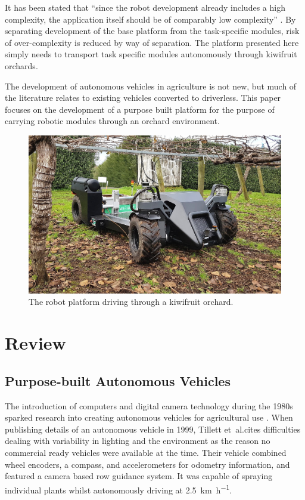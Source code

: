 \documentclass[preprint,authoryear,12pt]{elsarticle}
\begin{document}
    It has been stated that ``since the robot development already includes a high complexity, the application itself should be of comparably low complexity'' \citep{Ruckelshausen2009}.
    By separating development of the base platform from the task-specific modules, risk of over-complexity is reduced by way of separation.
    The platform presented here simply needs to transport task specific modules autonomously through kiwifruit orchards.

    The development of autonomous vehicles in agriculture is not new, but much of the literature relates to existing vehicles converted to driverless.
    This paper focuses on the development of a purpose built platform for the purpose of carrying robotic modules through an orchard environment.

    \begin{figure}[htb]
        \centering
        \includegraphics[width=\linewidth]{imgs/photos/suzy_general.jpg}
        \caption{
            The robot platform driving through a kiwifruit orchard.
        }
        \label{fig:suzy}
    \end{figure}

\section{Review}
\label{sect:review}

    \subsection{Purpose-built Autonomous Vehicles}

        The introduction of computers and digital camera technology during the 1980s sparked research into creating autonomous vehicles for agricultural use \cite{Li2009}.
        When publishing details of an autonomous vehicle in 1999, Tillett et~al.\@ cites difficulties dealing with variability in lighting and the environment as the reason no commercial ready vehicles were available at the time.
        Their vehicle combined wheel encoders, a compass, and accelerometers for odometry information, and featured a camera based row guidance system.
        It was capable of spraying individual plants whilst autonomously driving at \SI{2.5}{\kilo\meter\per\hour}.
        
\end{document}
